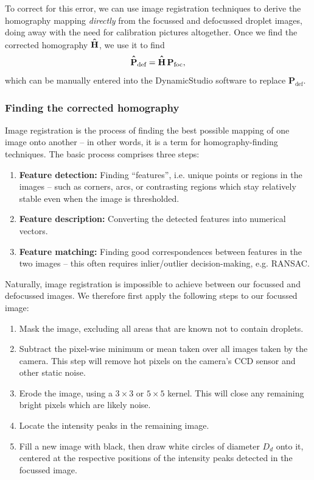 \documentclass[11.5pt]{book}
\newcommand*{\Hhat}{\hat{\vphantom{\scalebox{1.2}{H}} H}}
\newcommand*{\Phat}{\hat{\vphantom{\scalebox{1.2}{P}} P}}
\begin{document}
To correct for this error, we can use image registration techniques to derive
the homography mapping \emph{directly} from the focussed and defocussed droplet
images, doing away with the need for calibration pictures altogether. Once we
find the corrected homography $\mathbf{\Hhat}$, we use it to find
\begin{equation}
    \mathbf{\Phat}_\text{def} = \mathbf{\Hhat} \, \mathbf{P}_\text{foc},
    \label{corrected-homography-use}
\end{equation}
which can be manually entered into the DynamicStudio software to replace
$\mathbf{P}_\text{def}$.

\subsubsection{Finding the corrected homography}
Image registration is the process of finding the best possible mapping of one
image onto another -- in other words, it is a term for homography-finding
techniques. The basic process comprises three steps:
\begin{enumerate}
    \item \textbf{Feature detection:} Finding ``features'', i.e. unique points or regions in the images --
        such as corners, arcs, or contrasting regions which stay
        relatively stable even when the image is thresholded.
    \item \textbf{Feature description:} Converting the detected features into
        numerical vectors.
    \item \textbf{Feature matching:} Finding good correspondences between
        features in the two images -- this often requires inlier/outlier
        decision-making, e.g. RANSAC.
\end{enumerate}

Naturally, image registration is impossible to achieve between our focussed and
defocussed images. We therefore first apply the following steps to our focussed
image:

\begin{enumerate}
    \item Mask the image, excluding all areas that are known not to contain
        droplets.
    \item Subtract the pixel-wise minimum or mean taken over all images taken by
        the camera. This step will remove hot pixels on the camera's CCD sensor
        and other static noise.
    \item Erode the image, using a $3 \times 3$ or $5 \times 5$ kernel. This
        will close any remaining bright pixels which are likely noise.
    \item Locate the intensity peaks in the remaining image.
    \item Fill a new image with black, then draw white circles of diameter $D_d$
        onto it, centered at the respective positions of the intensity peaks
        detected in the focussed image.
\end{enumerate}
\end{document}
